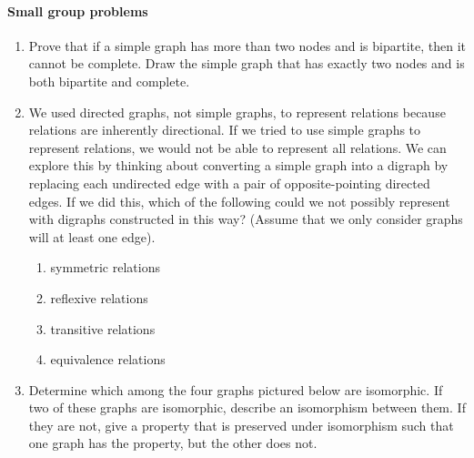 \documentclass[12pt]{article}
\begin{document}
\paragraph*{Small group problems}

\begin{enumerate}

\item Prove that if a simple graph has more than two nodes and is bipartite, then it cannot be complete. Draw the simple graph that has exactly two nodes and is both bipartite and complete.


\item We used directed graphs, not simple graphs, to represent relations because relations are inherently directional. If we tried to use simple graphs to represent relations, we would not be able to represent all relations. We can explore this by thinking about converting a simple graph into a digraph by replacing each undirected edge with a pair of opposite-pointing directed edges. If we did this, which of the following could we not possibly represent with digraphs constructed in this way? (Assume that we only consider graphs will at least one edge).
\begin{enumerate}
\item symmetric relations

\item reflexive relations

\item transitive relations

\item equivalence relations

\end{enumerate}

\item Determine which among the four graphs pictured below are isomorphic.  If two of these graphs are
isomorphic, describe an isomorphism between them.  If they are not,
give a property that is preserved under isomorphism such that one
graph has the property, but the other does not.


\end{enumerate}
\end{document}
